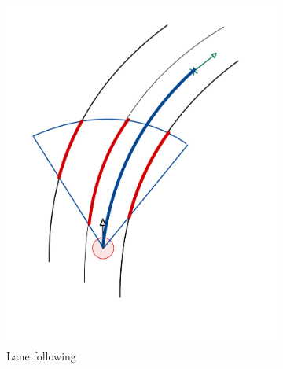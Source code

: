 \begin{figure}
	\centering
	\begin{subfigure}{.3\linewidth}
		\includegraphics[width=\textwidth]{Pictures/lane following draw}
		\caption{Lane following}
		\end{subfigure}	
	\begin{subfigure}{.3\linewidth}

\end{subfigure}
\end{figure}
